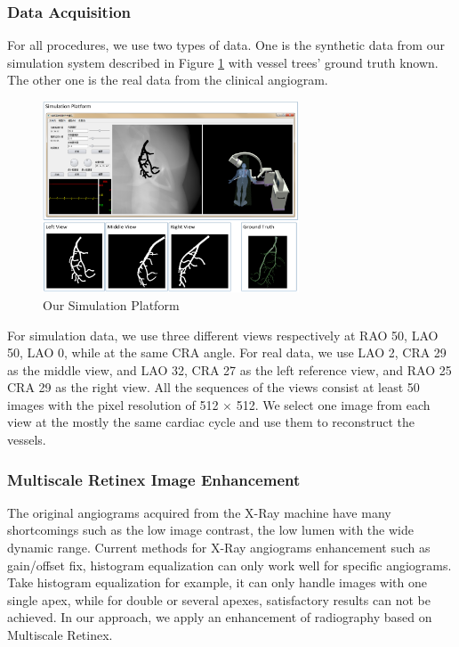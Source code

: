\subsubsection{Data Acquisition}
For all procedures, we use two types of data. One is the synthetic data from our simulation
system described in Figure \ref{fig:simu_plaform} with vessel trees' ground truth known.
The other one is the real data from the clinical angiogram.

\begin{figure}
  \centering
  \includegraphics[width=3.0in]{simu_platform_with_data.png}
  \caption{Our Simulation Platform}
  \label{fig:simu_plaform}
\end{figure}

For simulation data, we use three different views respectively at RAO 50, LAO 50, LAO 0,
while at the same CRA angle. For real data, we use LAO 2, CRA 29 as the middle view, and
LAO 32, CRA 27 as the left reference view, and RAO 25 CRA 29 as the right view. All the
sequences of the views consist at least 50 images with the pixel resolution of 512 $\times$ 512.
We select one image from each view at the mostly the same cardiac cycle and use them to
reconstruct the vessels.


\subsubsection{Multiscale Retinex Image Enhancement}
The original angiograms acquired from the X-Ray machine have many
shortcomings such as the low image contrast, the low lumen with the
wide dynamic range. Current methods for X-Ray angiograms enhancement
such as gain/offset fix, histogram equalization can only work well for
specific angiograms. Take histogram equalization for example, it can
only handle images with one single apex, while for double or several
apexes, satisfactory results can not be achieved. In our approach, we
apply an enhancement of radiography based on Multiscale Retinex.

